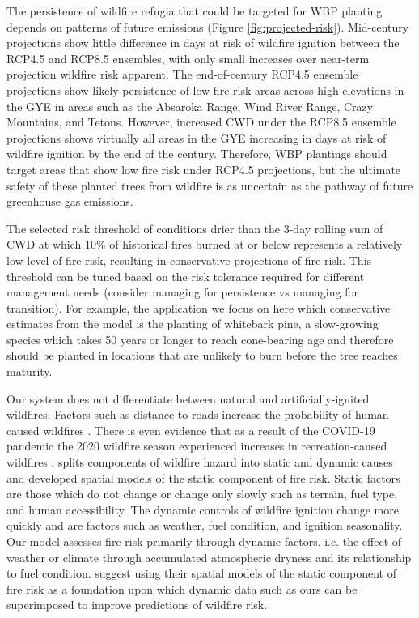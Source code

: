 \documentclass[11p]{article}
\begin{document}
The persistence of wildfire refugia that could be targeted for WBP planting depends on patterns of future emissions (Figure \ref{fig:projected-risk}). Mid-century projections show little difference in days at risk of wildfire ignition between the RCP4.5 and RCP8.5 ensembles, with only small increases over near-term projection wildfire risk apparent. The end-of-century RCP4.5 ensemble projections show likely persistence of low fire risk areas across high-elevations in the GYE in areas such as the Absaroka Range, Wind River Range, Crazy Mountains, and Tetons. However, increased CWD under the RCP8.5 ensemble projections shows virtually all areas in the GYE increasing in days at risk of wildfire ignition by the end of the century. Therefore, WBP plantings should target areas that show low fire risk under RCP4.5 projections, but the ultimate safety of these planted trees from wildfire is as uncertain as the pathway of future greenhouse gas emissions.

The selected risk threshold of conditions drier than the 3-day rolling sum of CWD at which 10\% of historical fires burned at or below represents a relatively low level of fire risk, resulting in conservative projections of fire risk. This threshold can be tuned based on the risk tolerance required for different management needs (consider managing for persistence vs managing for transition). For example, the application we focus on here which conservative estimates from the model is the planting of whitebark pine, a slow-growing species which takes 50 years or longer to reach cone-bearing age \citep{tombackWhitebarkPineCommunities2001} and therefore should be planted in locations that are unlikely to burn before the tree reaches maturity.

Our system does not differentiate between natural and artificially-ignited wildfires. Factors such as distance to roads increase the probability of human-caused wildfires \citep{jimenez-ruanoSpatialPredictionsHuman2022}. There is even evidence that as a result of the COVID-19 pandemic the 2020 wildfire season experienced increases in recreation-caused wildfires \citep{jorgeCOVID19FueledElevated2025}. \citet{jimenez-ruanoSpatialPredictionsHuman2022} splits components of wildfire hazard into static and dynamic causes and developed spatial models of the static component of fire risk. Static factors are those which do not change or change only slowly such as terrain, fuel type, and human accessibility. The dynamic controls of wildfire ignition change more quickly and are factors such as weather, fuel condition, and ignition seasonality. Our model assesses fire risk primarily through dynamic factors, i.e. the effect of weather or climate through accumulated atmospheric dryness and its relationship to fuel condition. \citet{jimenez-ruanoSpatialPredictionsHuman2022} suggest using their spatial models of the static component of fire risk as a foundation upon which dynamic data such as ours can be superimposed to improve predictions of wildfire risk.
\end{document}

